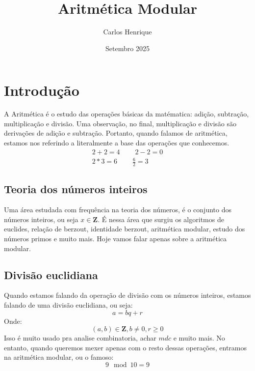 \documentclass[12pt]{article}
\title{Aritmética Modular}
\author{Carlos Henrique}
\date{Setembro 2025}
\begin{document}
    \maketitle
    \section{Introdução}
    A Aritmética é o estudo das operações básicas da matématica: adição, subtração, multiplicação e divisão. Uma observação, no final, multiplicação e divisão são derivações de adição e subtração. Portanto, quando falamos de aritmética, estamos nos referindo a literalmente a base das operações que conhecemos.
    \begin{equation}
        \begin{split}
            2+2 = 4 \ \ \ \ \ \ \ \ \ \ 2-2 = 0\\
            2*3 = 6 \ \ \ \ \ \ \ \ \ \ \frac{6}{2} = 3
        \end{split}
    \end{equation}
    \subsection{Teoria dos números inteiros}
    Uma área estudada com frequência na teoria dos números, é o conjunto dos números inteiros, ou seja $x \in \textbf{Z}$. É nessa área que surgiu os algoritmos de euclides, relação de berzout, identidade berzout, aritmética modular, estudo dos números primos e muito mais. Hoje vamos falar apenas sobre a aritmética modular.
    \subsection{Divisão euclidiana}
    Quando estamos falando da operação de divisão com os números inteiros, estamos falando de uma divisão euclidiana, ou seja:
    \begin{equation}
        a = bq + r
    \end{equation}
    Onde:
    \begin{equation}
        (a,b) \in \textbf{Z}, b \neq 0, r \geq 0
    \end{equation}
    Isso é muito usado pra analise combinatoria, achar $mdc$ e muito mais. No entanto, quando queremos mexer apenas com o resto dessas operações, entramos na aritmética modular, ou o famoso:
    \begin{equation}
        9 \mod 10 = 9
    \end{equation}
\end{document}
